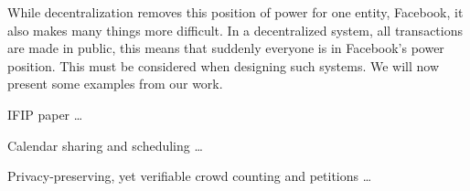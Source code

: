 While decentralization removes this position of power for one entity, \eg 
Facebook, it also makes many things more difficult.
In a decentralized system, all transactions are made in public, this means that 
suddenly everyone is in Facebook's power position.
This must be considered when designing such systems.
We will now present some examples from our work.

IFIP paper
\dots

Calendar sharing and scheduling
\dots

Privacy-preserving, yet verifiable crowd counting and petitions
\dots



\begin{frame}[allowframebreaks]
  \printbibliography
\end{frame}

